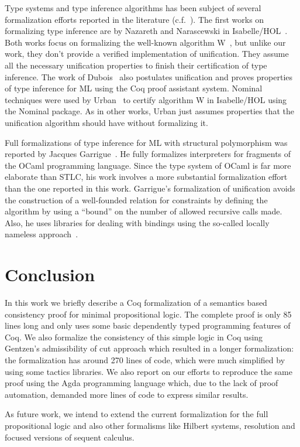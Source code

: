 Type systems and type inference algorithms has been subject of several formalization efforts
reported in the literature (c.f.~\cite{DuboisM99,NaraschewskiN-JAR,Nazareth-Nipkow,UrbanN2009,Garrigue10,Garrigue15}).
The first works on formalizing type inference are by Nazareth and
Narascewski in Isabelle/HOL~\cite{NaraschewskiN-JAR,Nazareth-Nipkow}.
Both works focus on formalizing the well-known algorithm
W~\cite{Milner1978}, but unlike our work, they don't provide a verified
implementation of unification. They assume all the necessary
unification properties to finish their certification of type
inference. The work of Dubois~\cite{DuboisM99} also postulates
unification and proves properties of type inference for ML using the
Coq proof assistant system.  Nominal techniques were used by
Urban~\cite{UrbanN2009} to certify algorithm W in Isabelle/HOL using
the Nominal package. As in other works, Urban just assumes properties
that the unification algorithm should have without formalizing it.


Full formalizations of type inference for ML with structural
polymorphism was reported by Jacques
Garrigue~\cite{Garrigue10,Garrigue15}. He fully formalizes
interpreters for fragments of the OCaml programming language. Since
the type system of OCaml is far more elaborate than STLC, his work
involves a more substantial formalization effort than the one reported
in this work. Garrigue's formalization of unification avoids the
construction of a well-founded relation for constraints by defining
the algorithm by using a ``bound'' on the number of allowed recursive
calls made.  Also, he uses libraries for dealing with bindings using
the so-called locally nameless approach~\cite{Chargueraud12}.


\section{Conclusion}\label{sec:conclusion}


In this work we briefly describe a Coq formalization of a semantics based consistency proof for
minimal propositional logic. The complete proof is only 85 lines long and only uses some basic
dependently typed programming features of Coq. We also
formalize the consistency of this simple logic in Coq using Gentzen's admissibility of cut approach
which resulted in a longer formalization: the formalization has around 270 lines of code, which were much
simplified by using some tactics libraries. We also report on our efforts to reproduce the same proof
using the Agda programming language which, due to the lack of proof automation, demanded more lines of code
to express similar results.


As future work, we intend to extend the current formalization for the full propositional logic and also
other formalisms like Hilbert systems, resolution and focused versions of sequent calculus.
 \begin{coqdoccode}
\end{coqdoccode}
